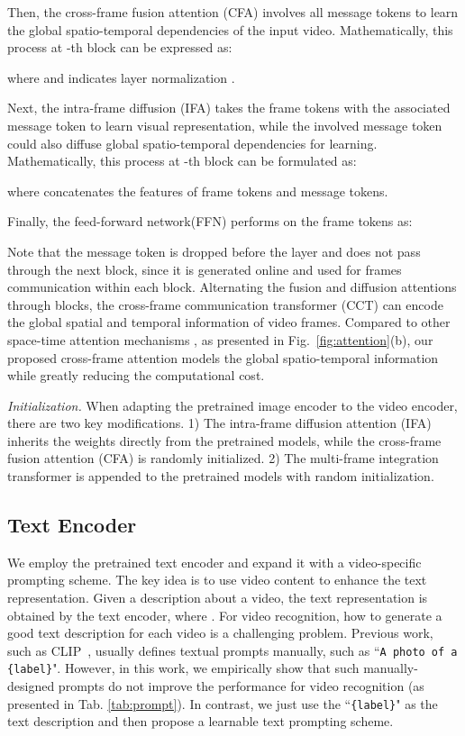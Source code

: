 \documentclass[runningheads]{llncs}
\begin{document}
Then, the cross-frame fusion attention (CFA) involves all message tokens to learn the global spatio-temporal dependencies of the input video.  Mathematically, this process at -th block can be expressed as:

where  and  indicates layer normalization \cite{layernorm}.

Next, the intra-frame diffusion (IFA) takes the frame tokens with the associated message token to learn visual representation, while the involved message token could also diffuse global spatio-temporal dependencies for learning. Mathematically, this process at -th block can be formulated as:

where  concatenates the features of frame tokens and message tokens.

Finally, the feed-forward network(FFN) performs on the frame tokens as:

Note that the message token is dropped before the  layer and does not pass through the next block, since it is generated online and used for frames communication within each block. Alternating the fusion and diffusion attentions through  blocks, the cross-frame communication transformer (CCT) can encode the global spatial and temporal information of video frames. Compared to other space-time attention mechanisms \cite{arnab2021vivit,timesformer2021,liu2021video}, as presented in Fig.~\ref{fig:attention}(b), our proposed cross-frame attention models the global spatio-temporal information while greatly reducing the computational cost.

\textit{Initialization.} When adapting the pretrained image encoder to the video encoder, there are two key modifications. 1) The intra-frame diffusion attention (IFA) inherits the weights directly from the pretrained models, while the cross-frame fusion attention (CFA) is randomly initialized. 2) The multi-frame integration transformer is appended to the pretrained models with random initialization. 

\subsection{Text Encoder}\label{sec:text}
We employ the pretrained text encoder and expand it with a video-specific prompting scheme. The key idea is to use video content to enhance the text representation. Given a description  about a video, the text representation  is obtained by the text encoder, where . For video recognition, how to generate a good text description  for each video is a challenging problem. Previous work, such as CLIP~\cite{clip}, usually defines textual prompts manually, such as ``\texttt{A photo of a \{label\}}". However, in this work, we empirically show that such manually-designed prompts do not improve the performance for video recognition (as presented in Tab. \ref{tab:prompt}). In contrast, we just use the ``\texttt{\{label\}}" as the text description  and then propose a learnable text prompting scheme. 
\end{document}
